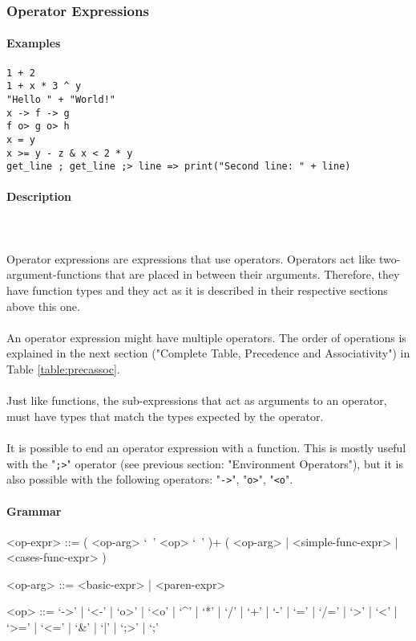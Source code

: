 \documentclass{article}
\def\pend{\mbox{} \\\\}
\begin{document}
\subsubsection{Operator Expressions}

\paragraph{Examples}
\begin{verbatim}
1 + 2
1 + x * 3 ^ y
"Hello " + "World!"
x -> f -> g
f o> g o> h
x = y
x >= y - z & x < 2 * y
get_line ; get_line ;> line => print("Second line: " + line)
\end{verbatim}

\paragraph{Description}\pend
Operator expressions are expressions that use operators. Operators act like
two-argument-functions that are placed in between their arguments. Therefore,
they have function types and they act as it is described in their respective
sections above this one.
\\\\
An operator expression might have multiple operators. The order of operations
is explained in the next section ("Complete Table, Precedence and Associativity")
in Table \ref{table:precassoc}.
\\\\
Just like functions, the sub-expressions
that act as arguments to an operator, must have types that match the types 
expected by the operator.
\\\\
It is possible to end an operator expression with a function. This is mostly
useful with the "\texttt{;>}" operator (see previous section: "Environment
Operators"), but it is also possible with the following operators:
"\texttt{->}", "\texttt{o>}", "\texttt{<o}".

\paragraph{Grammar}
\begin{grammar}
<op-expr> ::=
( <op-arg> `\ ' <op> `\ ' )+ ( <op-arg> | <simple-func-expr> | <cases-func-expr> )

<op-arg> ::= <basic-expr> | <paren-expr>

<op> ::= 
`->' | `<-' | `o>' | `<o' | `^' | `*' | `/' | `+' | `-' |
`=' | `/=' | `>' | `<' | `>=' | `<=' | `\&' | `|' | `;>' | `;'\\

\end{grammar}
\end{document}
